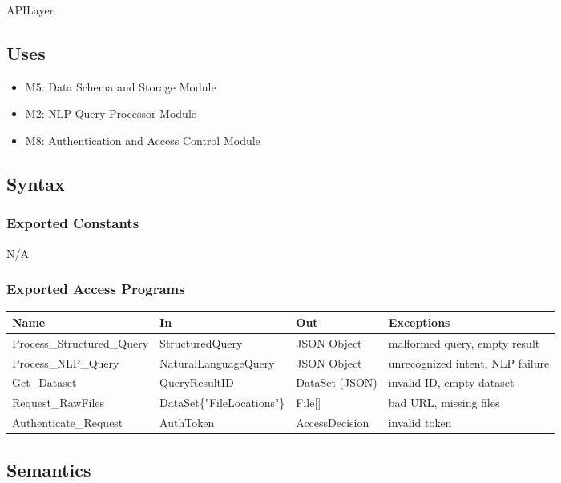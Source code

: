 \documentclass[12pt, titlepage]{article}
\begin{document}
APILayer

\subsection{Uses}

\begin{itemize}
    \item M5: Data Schema and Storage Module
    \item M2: NLP Query Processor Module
    \item M8: Authentication and Access Control Module
\end{itemize}

\subsection{Syntax}

\subsubsection{Exported Constants}

\par{N/A}

\subsubsection{Exported Access Programs}

\begin{center}
\begin{tabularx}{\textwidth}{X X l X}
\hline
\textbf{Name} & \textbf{In} & \textbf{Out} & \textbf{Exceptions} \\
\hline
Process\_Structured\_Query & StructuredQuery & JSON Object & malformed query, empty result \\
Process\_NLP\_Query &  NaturalLanguageQuery & JSON Object & unrecognized intent, NLP failure \\
Get\_Dataset & QueryResultID & DataSet (JSON) & invalid ID, empty dataset \\
Request\_RawFiles & DataSet\{"FileLocations"\} & File[] & bad URL, missing files \\
Authenticate\_Request & AuthToken & AccessDecision & invalid token \\
\hline
\end{tabularx}
\end{center}


\subsection{Semantics}
\end{document}
